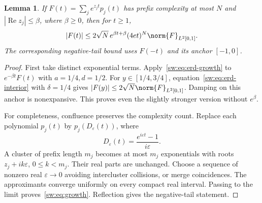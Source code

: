 \documentclass[11pt,a4paper]{article}
\numberwithin{equation}{section}
\newtheorem{lemma}[theorem]{Lemma}
\theoremstyle{definition}\newtheorem{definition}[theorem]{Definition}
\theoremstyle{remark}\newtheorem{remark}[theorem]{Remark}
\DeclareMathOperator{\Rea}{Re}\DeclareMathOperator{\Ima}{Im}
\begin{document}
\begin{lemma}\label{sw:lem:growth}
If $F(t)=\sum_j e^{z_jt}p_j(t)$ has prefix complexity at most $N$ and $|\Rea z_j|\le\beta$, where $\beta\ge0$, then for $t\ge1$,
\begin{equation}\label{sw:eq:growth}
 |F(t)|\le2\sqrt N\,e^{\beta t+\beta}(4et)^N
                         \norm{F}_{L^2[0,1]}.
\end{equation}
The corresponding negative-tail bound uses $F(-t)$ and its anchor $[-1,0]$.
\end{lemma}
\begin{proof}
First take distinct exponential terms. Apply~\eqref{sw:eq:erd-growth} to $e^{-\beta t}F(t)$ with $a=1/4,d=1/2$. For $y\in[1/4,3/4]$, equation~\eqref{sw:eq:erd-interior} with $\delta=1/4$ gives
$|F(y)|\le2\sqrt N\norm{F}_{L^2[0,1]}$. Damping on this anchor is nonexpansive. This proves even the slightly stronger version without $e^\beta$.

For completeness, confluence preserves the complexity count. Replace each polynomial $p_j(t)$ by $p_j(D_\varepsilon(t))$, where
\begin{equation}\label{sw:eq:D}
 D_\varepsilon(t)=\frac{e^{i\varepsilon t}-1}{i\varepsilon}.
\end{equation}
A cluster of prefix length $m_j$ becomes at most $m_j$ exponentials with roots $z_j+ik\varepsilon$, $0\le k<m_j$. Their real parts are unchanged. Choose a sequence of nonzero real $\varepsilon\to0$ avoiding intercluster collisions, or merge coincidences. The approximants converge uniformly on every compact real interval. Passing to the limit proves~\eqref{sw:eq:growth}. Reflection gives the negative-tail statement.
\end{proof}
\end{document}
